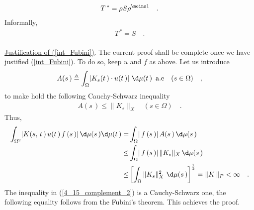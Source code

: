 \begin{align}
 T^{\,\ast}   =  \rho S \rho^{\moins 1} \quad .
\end{align}
Informally, 
\begin{align}
T^{\,\ast} = S\quad .
\end{align}
\\
\underline{Justification of (\ref{int_Fubini})}. The current proof shall be complete once we have justified (\ref{int_Fubini}). To do so, keep $u$ and $f$ as above. Let us introduce
\begin{align}
A(s\,)\Def \int_\Omega \lvert K_s(t\,) \cdot u (t\,)\rvert  \,\, \d\mu(t\,) \, \,\,\text{a.e}  \quad (s\in \Omega)\quad ,
\end{align}
to make hold the following Cauchy-Schwarz inequality
\begin{align}
A(s\,)\leq \| K_s\|_X  \quad (s\in \Omega)\quad .
\end{align}
Thus,
\begin{align}
 \int_{\Omega^2} \lvert K(s,\,t\,) \, u(t\,)\,  f\,(s\,) \rvert \,\d\mu(s\,)\d\mu(t\,) 
 = &   \int_\Omega   \lvert \,f\,(s\,) \rvert \,A(s\,) \, \d\mu(s\,) \\
 \leq &  \int_\Omega   \lvert \,f\,(s\,) \rvert  \, \| K_s\|_X\,\d\mu(s\,) \\
 \label{4_15_complement_2} \leq & \left[ \int_\Omega \| K_s\|_X^2\,\,\d\mu(s\,) \right]^{\frac{1}{2}} 
 =      \| K\,\|_P < \infty \quad .
 \end{align}
The inequality in (\ref{4_15_complement_2}) is a Cauchy-Schwarz one, the following equality follows from the Fubini's theorem. This achieves the proof.\QED








